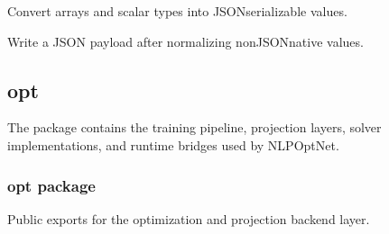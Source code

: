 \documentclass[letterpaper,10pt,english,openany,oneside]{sphinxmanual}
\begin{document}

\begin{fulllineitems}
\label{\detokenize{api/core/nlpoptnet/utils:nlpoptnet.utils.json_safe}}
\pysigstartsignatures
{}
\pysigstopsignatures
\sphinxAtStartPar
Convert arrays and scalar types into JSON\sphinxhyphen{}serializable values.

\end{fulllineitems}


\begin{fulllineitems}
\label{\detokenize{api/core/nlpoptnet/utils:nlpoptnet.utils.write_json}}
\pysigstartsignatures
{}
\pysigstopsignatures
\sphinxAtStartPar
Write a JSON payload after normalizing non\sphinxhyphen{}JSON\sphinxhyphen{}native values.

\end{fulllineitems}


\sphinxstepscope


\subsection{opt}
\label{\detokenize{api/core/opt/index:opt}}\label{\detokenize{api/core/opt/index::doc}}
\sphinxAtStartPar
The  package contains the training pipeline, projection layers, solver implementations, and runtime bridges used by NLPOptNet.

\sphinxstepscope


\subsubsection{opt package}
\label{\detokenize{api/core/opt/module_init:module-opt}}\label{\detokenize{api/core/opt/module_init:opt-package}}\label{\detokenize{api/core/opt/module_init::doc}}
\sphinxAtStartPar
Public exports for the optimization and projection backend layer.
\end{document}
